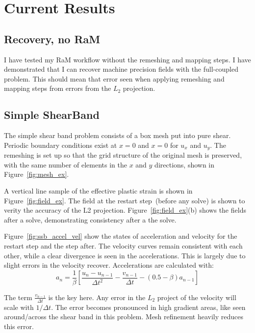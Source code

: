 \section{Current Results}\label{s:current_results}

\subsection{Recovery, no RaM}

I have tested my RaM workflow without the remeshing and mapping steps. I have demonstrated that I can recover machine precision fields with the full-coupled problem. This should mean that error seen when applying remeshing and mapping steps from errors from the $L_2$ projection.

\FloatBarrier{}
\subsection{Simple ShearBand}\label{ss:simple_shearband}

The simple shear band problem consists of a box mesh put into pure shear. Periodic boundary conditions exist at $x=0$ and $x=0$ for $u_x$ and $u_y$. The remeshing is set up so that the grid structure of the original mesh is preserved, with the same number of elements in the $x$ and $y$ directions, shown in Figure~\ref{fig:mesh_ex}. 

A vertical line sample of the effective plastic strain is shown in Figure~\ref{fig:field_ex}. The field at the restart step~(before any solve) is shown to verity the accuracy of the L2 projection. Figure~\ref{fig:field_ex}(b) shows the fields after a solve, demonstrating consistency after a the solve. 

Figure~\ref{fig:ssb_accel_vel} show the states of acceleration and velocity for the restart step and the step after. The velocity curves remain consistent with each other, while a clear divergence is seen in the accelerations. This is largely due to slight errors in the velocity recover. Accelerations are calculated with:
\begin{equation}
    a_n = \frac{1}{\beta}\left[\frac{u_n-u_{n-1}}{\Delta t^2}-\frac{v_{n-1}}{\Delta t}-(0.5-\beta)a_{n-1}\right]
\end{equation}

The term $\frac{v_{n-1}}{\Delta t}$ is the key here. Any error in the $L_2$ project of the velocity will scale with $1/\Delta t$. The error becomes pronounced in high gradient areas, like seen around/across the shear band in this problem. Mesh refinement heavily reduces this error. 

